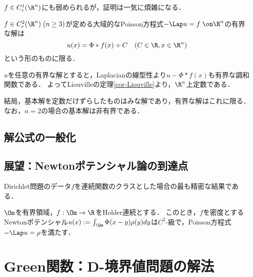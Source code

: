 \documentclass[uplatex,dvipdfmx]{jsreport}
\begin{document}
\begin{remark}
    $f\in C^1_c(\R^n)$にも弱められるが，証明は一気に煩雑になる\cite{Gilbarg}．
\end{remark}

\begin{corollary}
    $f\in C_c^2(\R^n)\;(n\ge3)$が定める大域的なPoisson方程式$-\Lap u=f\;\on\R^n$の有界な解は
    \[u(x)=\Phi*f(x)+C\quad(C\in\R,x\in\R^n)\]
    という形のものに限る．
\end{corollary}
\begin{Proof}
    $u$を任意の有界な解とすると，Laplacianの線型性より$u-\Phi*f(x)$も有界な調和関数である．
    よってLiouvilleの定理\ref{cor-Liouville}より，$\R^n$上定数である．
\end{Proof}

\begin{remarks}
    結局，基本解を定数だけずらしたものはみな解であり，有界な解はこれに限る．
    なお，$n=2$の場合の基本解は非有界である．
\end{remarks}

\subsection{解公式の一般化}

\subsection{展望：Newtonポテンシャル論の到達点}

\begin{tcolorbox}[colframe=ForestGreen, colback=ForestGreen!10!white,breakable,colbacktitle=ForestGreen!40!white,coltitle=black,fonttitle=\bfseries\sffamily,
title=]
    Dirichlet問題のデータ$f$を連続関数のクラスとした場合の最も精密な結果である．

\end{tcolorbox}

\begin{theorem}[Holder]
    $\Om$を有界領域，$f:\Om\to\R$をHolder連続とする．
    このとき，$f$を密度とするNewtonポテンシャル$u(x):=\int_\Om\Phi(x-y)\rho(y)dy$は$C^2$-級で，Poisson方程式$-\Lap u=\rho$を満たす．
\end{theorem}

\section{Green関数：D-境界値問題の解法}
\end{document}
